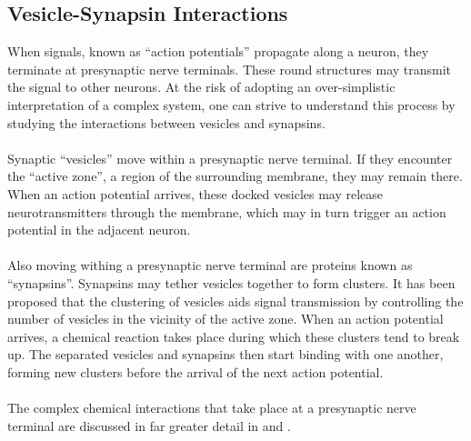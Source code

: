 \documentclass{acm_proc_article-sp}
\begin{document}
\subsection{Vesicle-Synapsin Interactions}
When signals, known as ``action potentials'' propagate
along a neuron, they terminate at presynaptic nerve 
terminals.  These round structures may transmit the 
signal to other neurons.  At the risk of adopting
an over-simplistic interpretation of a complex system, one can 
strive to understand this process by studying the
interactions between vesicles and synapsins. \\
\\
Synaptic ``vesicles'' move within a presynaptic nerve
terminal.  If they encounter the ``active zone'', a
region of the surrounding membrane, they may remain 
there.  When an action potential arrives, these docked
vesicles may release neurotransmitters through the
membrane, which may in
turn trigger an action potential in the adjacent neuron.\\
\\
Also moving withing a presynaptic nerve terminal are
proteins known as ``synapsins''.  Synapsins may tether vesicles 
together to form clusters.  It has been proposed that 
the clustering of vesicles aids signal transmission 
by controlling the number of vesicles in the vicinity 
of the active zone.  When an action potential arrives, 
a chemical reaction takes
place during which these clusters tend to break up.  The
separated vesicles and synapsins then start binding
with one another, forming new clusters before the 
arrival of the next action potential. \\
\\
The complex chemical interactions that take place at
a presynaptic nerve terminal are discussed in far
greater detail in \cite{Turner:Protein_phosphorylation} 
and \cite{Fdez:Vesicle_pools_and_synapsins}.
\end{document}
